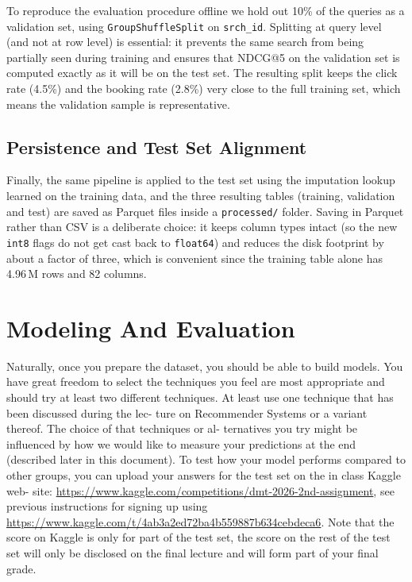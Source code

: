 \documentclass[runningheads]{llncs}
\begin{document}
To reproduce the evaluation procedure offline we hold out 10\% of the queries as a validation set, using \texttt{GroupShuffleSplit} on \texttt{srch\_id}. Splitting at query level (and not at row level) is essential: it prevents the same search from being partially seen during training and ensures that NDCG@5 on the validation set is computed exactly as it will be on the test set. The resulting split keeps the click rate (4.5\%) and the booking rate (2.8\%) very close to the full training set, which means the validation sample is representative.

\subsection{Persistence and Test Set Alignment}
Finally, the same pipeline is applied to the test set using the imputation lookup learned on the training data, and the three resulting tables (training, validation and test) are saved as Parquet files inside a \texttt{processed/} folder. Saving in Parquet rather than CSV is a deliberate choice: it keeps column types intact (so the new \texttt{int8} flags do not get cast back to \texttt{float64}) and reduces the disk footprint by about a factor of three, which is convenient since the training table alone has 4.96\,M rows and 82 columns.

\section{Modeling And Evaluation}

\color{blue}Naturally, once you prepare the dataset, you should be able to build models. You have great freedom to select the techniques you feel are most appropriate and should try at least two
different techniques. At least use one technique that has been discussed during the lec-
ture on Recommender Systems or a variant thereof. The choice of that techniques or al-
ternatives you try might be influenced by how we would like to measure your predictions
at the end (described later in this document). To test how your model performs compared
to other groups, you can upload your answers for the test set on the in class Kaggle web-
site: \href{https://www.kaggle.com/competitions/dmt-2026-2nd-assignment}{\url{https://www.kaggle.com/competitions/dmt-2026-2nd-assignment}}, see previous
instructions for signing up using \href{https://www.kaggle.com/t/4ab3a2ed72ba4b559887b634cebdeca6}{\url{https://www.kaggle.com/t/4ab3a2ed72ba4b559887b634cebdeca6}}.
Note that the score on Kaggle is only for part of the test set, the score on the rest of the test set
will only be disclosed on the final lecture and will form part of your final grade.\color{black}
\end{document}
